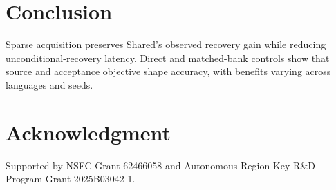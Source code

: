 \documentclass[conference,letterpaper]{IEEEtran}
\begin{document}
\section{Conclusion}
Sparse acquisition preserves Shared's observed recovery gain while reducing unconditional-recovery latency. Direct and matched-bank controls show that source and acceptance objective shape accuracy, with benefits varying across languages and seeds.
\section*{Acknowledgment}
Supported by NSFC Grant 62466058 and Autonomous Region Key R\&D Program Grant 2025B03042-1.
\label{iscas:body-end}\clearpage\raggedbottom\balance
\label{iscas:references-start}

\end{document}
